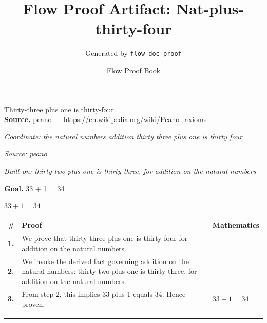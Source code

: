\documentclass[11pt]{article}
\title{Flow Proof Artifact: Nat-plus-thirty-four}
\author{Generated by \texttt{flow doc proof}}
\date{Flow Proof Book}
\theoremstyle{definition}
\begin{document}
\maketitle
Thirty-three plus one is thirty-four.\\[0.5em]
\textbf{Source.} peano — https://en.wikipedia.org/wiki/Peano\_axioms\\[0.5em]
\bigskip
{}\par
\smallskip\noindent\textit{Coordinate: the natural numbers \cdot addition \cdot thirty three plus one is thirty four}\par
\smallskip\noindent\textit{Source: peano}\par
\smallskip\noindent\textit{Built on: thirty two plus one is thirty three, for addition on the natural numbers}\par
\medskip
\noindent\textbf{Goal.} 33 + 1 = 34\par
\noindent$\displaystyle 33 + 1 = 34$\par
\medskip
\noindent
\begin{tabular}{@{} >{\raggedright\arraybackslash}p{} >{\raggedright\arraybackslash}p{} >{\raggedleft\arraybackslash}p{} @{}}
\textbf{\#} & \textbf{Proof} & \textbf{Mathematics} \\
\midrule
\textbf{1.} & We prove that thirty three plus one is thirty four for addition on the natural numbers. & \\[0.45em]
\textbf{2.} & We invoke the derived fact governing addition on the natural numbers: thirty two plus one is thirty three, for addition on the natural numbers. & \\[0.45em]
\textbf{3.} & From step 2, this implies 33 plus 1 equals 34. Hence proven. & $\displaystyle 33 + 1 = 34$ \\[0.45em]
\bottomrule
\end{tabular}
\label{thm:Nat-addition-thirty_three_plus_one_is_thirty_four}
\par\medskip\hrule
\end{document}
